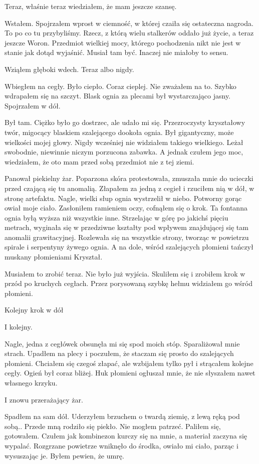 \documentclass[../MAIN.tex]{subfiles}
\begin{document}
Teraz, właśnie teraz wiedziałem, że mam jeszcze szansę.

Wstałem. Spojrzałem wprost w ciemność, w której czaiła się ostateczna nagroda. To po co tu przybyliśmy. Rzecz, z którą wielu stalkerów oddało już życie, a teraz jeszcze Woron. Przedmiot wielkiej mocy, którego pochodzenia nikt nie jest w stanie jak dotąd wyjaśnić. Musiał tam być. Inaczej nie miałoby to sensu.

Wziąłem głęboki wdech. Teraz albo nigdy.

Wbiegłem na cegły. Było ciepło. Coraz cieplej. Nie zważałem na to. Szybko wdrapałem się na szczyt. Blask ognia za plecami był wystarczająco jasny. Spojrzałem w dół.

Był tam. Ciężko było go dostrzec, ale udało mi się. Przezroczysty kryształowy twór, migocący blaskiem szalejącego dookoła ognia. Był gigantyczny, może wielkości mojej głowy. Nigdy wcześniej nie widziałem takiego wielkiego. Leżał swobodnie, niewinnie niczym porzucona zabawka. A jednak czułem jego moc, wiedziałem, że oto mam przed sobą przedmiot nie z tej ziemi.

Panował piekielny żar. Poparzona skóra protestowała, zmuszała mnie do ucieczki przed czającą się tu anomalią. Złapałem za jedną z cegieł i rzuciłem nią w dół, w stronę artefaktu. Nagle, wielki słup ognia wystrzelił w niebo. Potworny gorąc owiał moje ciało. Zasłoniłem ramieniem oczy, cofnąłem się o krok. Ta fontanna ognia byłą wyższa niż wszystkie inne. Strzelając w górę po jakichś pięciu metrach, wyginała się w przedziwne kształty pod wpływem znajdującej się tam anomalii grawitacyjnej. Rozlewała się na wszystkie strony, tworząc w powietrzu spirale i serpentyny żywego ognia. A na dole, wśród szalejących płomieni tańczył muskany płomieniami Kryształ.

Musiałem to zrobić teraz. Nie było już wyjścia. Skuliłem się i zrobiłem krok w przód po kruchych cegłach. Przez porysowaną szybkę hełmu widziałem go wśród płomieni.

Kolejny krok w dół

I kolejny.

Nagle, jedna z cegłówek obsunęła mi się spod moich stóp. Sparaliżował mnie strach. Upadłem na plecy i poczułem, że staczam się prosto do szalejących płomieni. Chciałem się czegoś złapać, ale wzbijałem tylko pył i strącałem kolejne cegły. Ogień był coraz bliżej. Huk płomieni ogłuszał mnie, że nie słyszałem nawet własnego krzyku.

I znowu przerażający żar.

Spadłem na sam dół. Uderzyłem brzuchem o twardą ziemię, z lewą ręką pod sobą.. Przede mną rodziło się piekło. Nie mogłem patrzeć. Paliłem się, gotowałem. Czułem jak kombinezon kurczy się na mnie, a materiał zaczyna się wypalać. Rozgrzane powietrze wniknęło do środka, owiało mi ciało, parząc i wysuszając je. Byłem pewien, że umrę.
\end{document}
